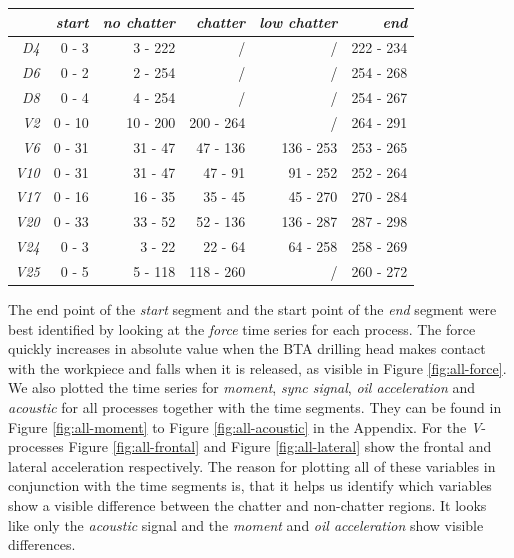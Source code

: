 \documentclass[12 pt]{scrartcl}
\begin{document}
\begin{table}[ht]
  \centering
  \label{tab:segmenttime}
  \begin{tabular}{r|rrrrr}
               & \emph{start} & \emph{no chatter} & \emph{chatter} & \emph{low chatter} & \emph{end} \\
    \hline
    \emph{D4}  & 0 - 3        & 3  - 222          & /              & /                  & 222 - 234  \\
    \emph{D6}  & 0 - 2        & 2  - 254          & /              & /                  & 254 - 268  \\
    \emph{D8}  & 0 - 4        & 4  - 254          & /              & /                  & 254 - 267  \\
    \emph{V2}  & 0 - 10       & 10 - 200          & 200 - 264      & /                  & 264 - 291  \\
    \emph{V6}  & 0 - 31       & 31 - 47           & 47  - 136      & 136 - 253          & 253 - 265  \\
    \emph{V10} & 0 - 31       & 31 - 47           & 47  - 91       & 91  - 252          & 252 - 264  \\
    \emph{V17} & 0 - 16       & 16 - 35           & 35  - 45       & 45  - 270          & 270 - 284  \\
    \emph{V20} & 0 - 33       & 33 - 52           & 52  - 136      & 136 - 287          & 287 - 298  \\
    \emph{V24} & 0 - 3        & 3  - 22           & 22  - 64       & 64  - 258          & 258 - 269  \\
    \emph{V25} & 0 - 5        & 5  - 118          & 118 - 260      & /                  & 260 - 272  \\
  \end{tabular}
\end{table}

The end point of the \emph{start} segment and the start point of the \emph{end} segment were best identified by looking at the \emph{force} time series for each process. The force quickly increases in absolute value when the BTA drilling head makes contact with the workpiece and falls when it is released, as visible in Figure \ref{fig:all-force}.
We also plotted the time series for \emph{moment}, \emph{sync signal}, \emph{oil acceleration} and \emph{acoustic} for all processes together with the time segments. They can be found in Figure \ref{fig:all-moment} to Figure \ref{fig:all-acoustic} in the Appendix. For the \emph{V}-processes Figure \ref{fig:all-frontal} and Figure \ref{fig:all-lateral} show the frontal and lateral acceleration respectively. The reason for plotting all of these variables in conjunction with the time segments is, that it helps us identify which variables show a visible difference between the chatter and non-chatter regions. It looks like only the \emph{acoustic} signal and the \emph{moment} and \emph{oil acceleration} show visible differences.
\end{document}
